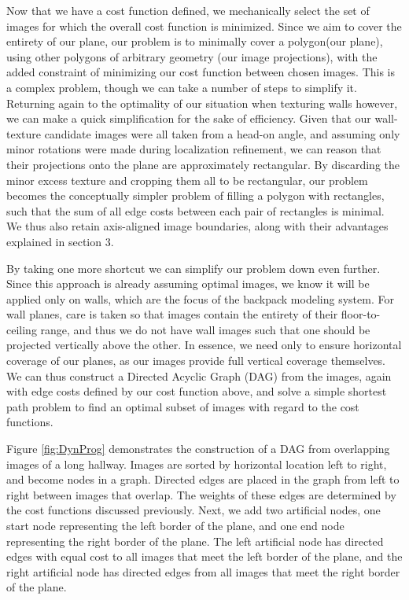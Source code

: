 \documentclass[10pt,twocolumn,letterpaper]{article}
\begin{document}
Now that we have a cost function defined, we mechanically select the
set of images for which the overall cost function is minimized. Since
we aim to cover the entirety of our plane, our problem is to minimally
cover a polygon(our plane), using other polygons of arbitrary geometry
(our image projections), with the added constraint of minimizing our
cost function between chosen images. This is a complex problem, though
we can take a number of steps to simplify it. Returning again to the
optimality of our situation when texturing walls however, we can make
a quick simplification for the sake of efficiency. Given that our
wall-texture candidate images were all taken from a head-on angle, and
assuming only minor rotations were made during localization
refinement, we can reason that their projections onto the plane are
approximately rectangular. By discarding the minor excess texture and
cropping them all to be rectangular, our problem becomes the
conceptually simpler problem of filling a polygon with rectangles,
such that the sum of all edge costs between each pair of rectangles is
minimal. We thus also retain axis-aligned image boundaries, along with
their advantages explained in section 3.

By taking one more shortcut we can simplify our problem down even
further. Since this approach is already assuming optimal images, we
know it will be applied only on walls, which are the focus of the
backpack modeling system. For wall planes, care is taken so that
images contain the entirety of their floor-to-ceiling range, and thus
we do not have wall images such that one should be projected
vertically above the other. In essence, we need only to ensure
horizontal coverage of our planes, as our images provide full vertical
coverage themselves. We can thus construct a Directed Acyclic Graph
(DAG) from the images, again with edge costs defined by our cost
function above, and solve a simple shortest path problem to find an
optimal subset of images with regard to the cost functions.


Figure \ref{fig:DynProg} demonstrates the construction of a DAG from
overlapping images of a long hallway. Images are sorted by horizontal
location left to right, and become nodes in a graph. Directed edges
are placed in the graph from left to right between images that
overlap. The weights of these edges are determined by the cost
functions discussed previously. Next, we add two artificial nodes, one
start node representing the left border of the plane, and one end node
representing the right border of the plane. The left artificial node
has directed edges with equal cost to all images that meet the left
border of the plane, and the right artificial node has directed edges
from all images that meet the right border of the plane.
\end{document}
